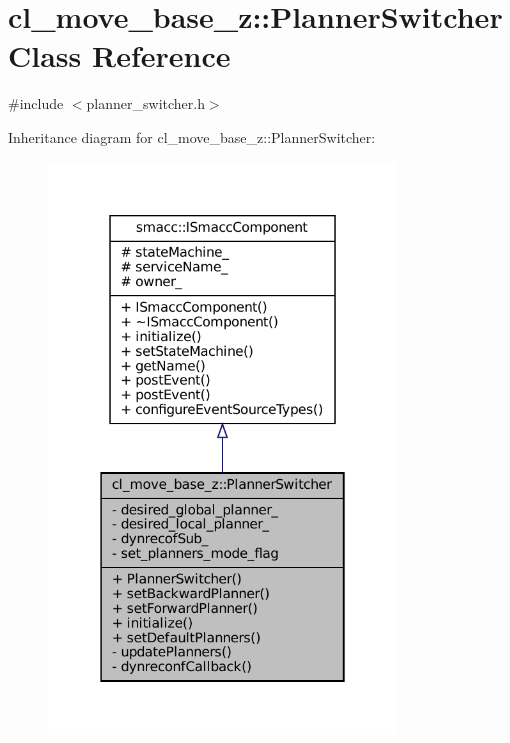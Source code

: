 \hypertarget{classcl__move__base__z_1_1PlannerSwitcher}{}\section{cl\+\_\+move\+\_\+base\+\_\+z\+:\+:Planner\+Switcher Class Reference}
\label{classcl__move__base__z_1_1PlannerSwitcher}


{\ttfamily \#include $<$planner\+\_\+switcher.\+h$>$}



Inheritance diagram for cl\+\_\+move\+\_\+base\+\_\+z\+:\+:Planner\+Switcher\+:
\nopagebreak
\begin{figure}[H]
\begin{center}
\leavevmode
\includegraphics[width=262pt]{classcl__move__base__z_1_1PlannerSwitcher__inherit__graph}
\end{center}
\end{figure}


